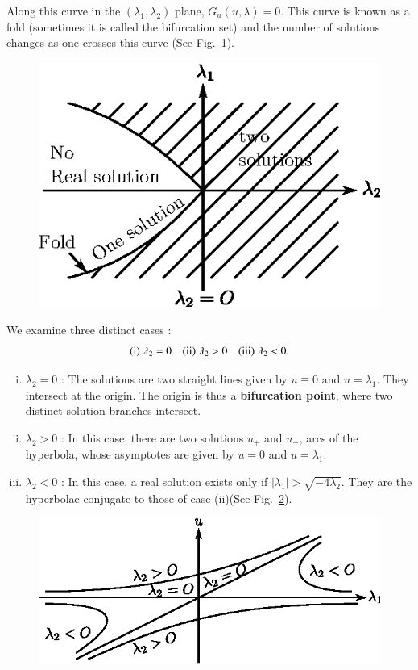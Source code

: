 Along this curve in the $(\lambda_1, \lambda_2)$ plane, $G_u(u,
\lambda)=0$. This curve is known as a fold (sometimes it is called the
bifurcation set) and the number of solutions changes as one crosses
this curve (See Fig.~\ref{chap1-sec1.2-fig1.2}). 

\begin{figure}[H]
\centering
\includegraphics{vol79-fig/fig79-2.eps}
\caption{}
\label{chap1-sec1.2-fig1.2}
\end{figure}\pageoriginale

We examine  three distinct cases : 
$$ 
{\rm (i)} \; \lambda_2 =0 \quad {\rm (ii)} \;  \lambda_2 >0 \quad {\rm
  (iii)} \;  \lambda_2 < 0. 
$$
\begin{enumerate}[(i)]
\item $\lambda_2=0$ : The solutions are two straight lines given by $u
  \equiv 0$ and $u =\lambda_1$. They intersect at the origin. The
  origin is thus a \textbf{bifurcation point}, where two distinct solution
  branches intersect.  

\item $\lambda_2 > 0$ : In this case, there are two solutions $u_+$
  and $u_-$, arcs of the hyperbola, whose asymptotes are given by
  $u=0$ and $u = \lambda_1$.  

\item $\lambda_2 < 0$ : In this case, a real solution exists only if
  $|\lambda_1|>\sqrt{-4\lambda _2}$. They are the hyperbolae conjugate
  to those of case (ii)\break (See Fig.~\ref{chap1-sec1.2-fig1.3}).  
\end{enumerate}

\begin{figure}[H]
\centering
\includegraphics{vol79-fig/fig79-3.eps}
\smallskip
\caption{}
\label{chap1-sec1.2-fig1.3}
\end{figure}

